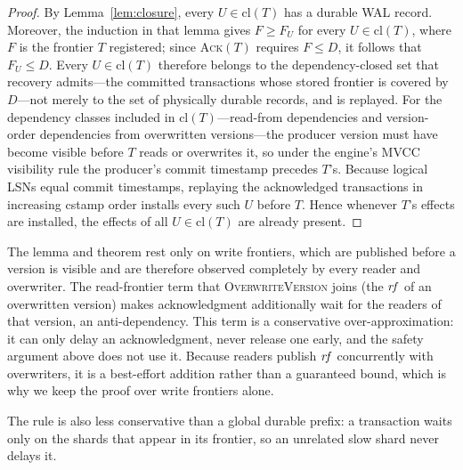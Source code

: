 \begin{proof}
By Lemma~\ref{lem:closure}, every $U \in \mathrm{cl}(T)$ has a durable WAL
record.  Moreover, the induction in that lemma gives $F \ge F_U$ for every
$U \in \mathrm{cl}(T)$, where $F$ is the frontier $T$ registered; since
\textsc{Ack}$(T)$ requires $F \le D$, it follows that $F_U \le D$.  Every
$U \in \mathrm{cl}(T)$ therefore belongs to the dependency-closed set that
recovery admits---the committed transactions whose stored frontier is covered
by $D$---not merely to the set of physically durable records, and is replayed.
For the dependency classes included in
$\mathrm{cl}(T)$---read-from dependencies and version-order dependencies from
overwritten versions---the producer version must have become visible before
$T$ reads or overwrites it, so under the engine's MVCC visibility rule the
producer's commit timestamp precedes $T$'s.  Because logical LSNs equal commit
timestamps, replaying the acknowledged transactions in increasing cstamp order
installs every such $U$ before $T$.  Hence whenever $T$'s effects
are installed, the effects of all $U \in \mathrm{cl}(T)$ are already
present.
\end{proof}

The lemma and theorem rest only on write frontiers, which are published
before a version is visible and are therefore observed completely by
every reader and overwriter.  The read-frontier term that
\textsc{OverwriteVersion} joins (the $\mathit{rf}$ of an overwritten version)
makes acknowledgment additionally wait for the readers of that version,
an anti-dependency.  This term is a conservative over-approximation: it
can only delay an acknowledgment, never release one early, and the
safety argument above does not use it.  Because readers publish $\mathit{rf}$
concurrently with overwriters, it is a best-effort addition rather than
a guaranteed bound, which is why we keep the proof over write frontiers
alone.

The rule is also less conservative than a global durable prefix: a
transaction waits only on the shards that appear in its frontier, so an
unrelated slow shard never delays it.

